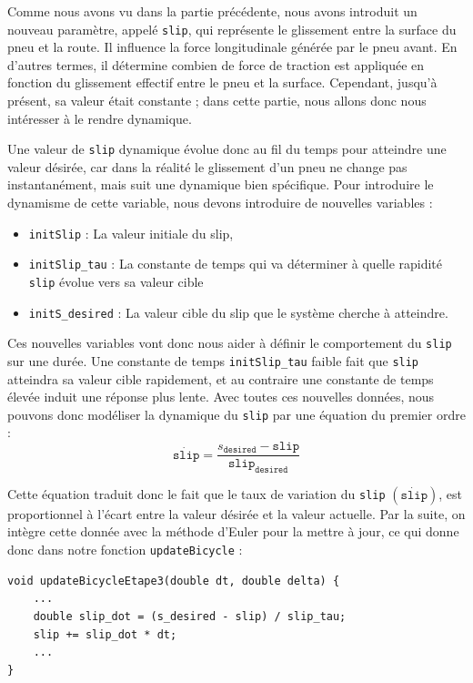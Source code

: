 Comme nous avons vu dans la partie précédente, nous avons introduit un nouveau paramètre, appelé \texttt{slip}, qui représente le glissement entre la surface du pneu et la route. Il influence la force longitudinale générée par le pneu avant. En d'autres termes, il détermine combien de force de traction est appliquée en fonction du glissement effectif entre le pneu et la surface. Cependant, jusqu'à présent, sa valeur était constante ; dans cette partie, nous allons donc nous intéresser à le rendre dynamique.

Une valeur de \texttt{slip} dynamique évolue donc au fil du temps pour atteindre une valeur désirée, car dans la réalité le glissement d'un pneu ne change pas instantanément, mais suit une dynamique bien spécifique. Pour introduire le dynamisme de cette variable, nous devons introduire de nouvelles variables :

\begin{itemize}
\item \texttt{initSlip} : La valeur initiale du slip,

\item \texttt{initSlip\_tau} : La constante de temps qui va déterminer à quelle rapidité \texttt{slip} évolue vers sa valeur cible

\item \texttt{initS\_desired} : La valeur cible du slip que le système cherche à atteindre.

\end{itemize}

Ces nouvelles variables vont donc nous aider à définir le comportement du \texttt{slip} sur une durée. Une constante de temps \texttt{initSlip\_tau} faible fait que \texttt{slip} atteindra sa valeur cible rapidement, et au contraire une constante de temps élevée induit une réponse plus lente. Avec toutes ces nouvelles données, nous pouvons donc modéliser la dynamique du \texttt{slip} par une équation du premier ordre :
$$\dot{\texttt{slip}} = \frac{s_{\texttt{desired}} - \texttt{slip}}{\texttt{slip}_{\texttt{desired}}}$$

Cette équation traduit donc le fait que le taux de variation du \texttt{slip} $(\dot{\texttt{slip}})$, est proportionnel à l'écart entre la valeur désirée et la valeur actuelle. Par la suite, on intègre cette donnée avec la méthode d'Euler pour la mettre à jour, ce qui donne donc dans notre fonction \texttt{updateBicycle} :

\begin{lstlisting}[style=CStyle]
void updateBicycleEtape3(double dt, double delta) {
    ...
    double slip_dot = (s_desired - slip) / slip_tau;
    slip += slip_dot * dt;
    ...
}
\end{lstlisting}

